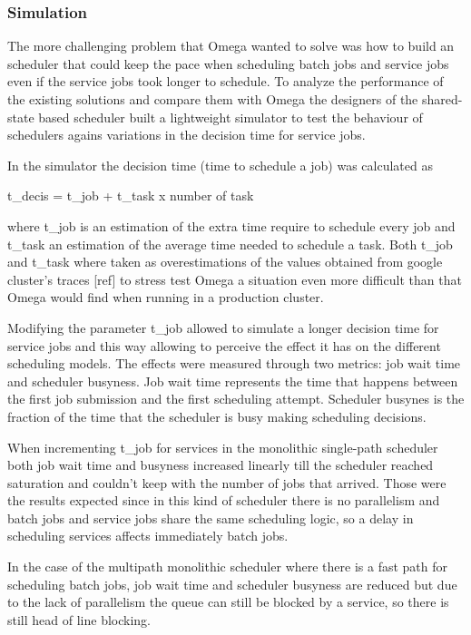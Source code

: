\documentclass{svjour3}                     %
\begin{document}
\subsubsection{Simulation}

The more challenging problem that Omega wanted to solve was how
to build an scheduler that could keep the pace when scheduling batch
jobs and service jobs even if the service jobs took longer to
schedule. To analyze the performance of the existing solutions and
compare them with Omega the designers of the shared-state based
scheduler built a lightweight simulator to test the behaviour of
schedulers agains variations in the decision time for service jobs.

In the simulator the decision time (time to schedule a job) was
calculated as

t\_{decis} = t\_{job} + t\_{task} x number of task

where t\_{job} is an estimation of the extra time require to schedule
every job and t\_{task} an estimation of the average time needed to
schedule a task. Both t\_{job} and t\_{task} where taken as
overestimations of the values obtained from google cluster's traces
[ref] to stress test Omega a situation even more difficult than that
Omega would find when running in a production cluster.

Modifying the parameter t\_{job} allowed to simulate a longer decision
time for service jobs and this way allowing to perceive the effect it
has on the different scheduling models. The effects were measured
through two metrics: job wait time and scheduler busyness. Job wait
time represents the time that happens between the first job submission
and the first scheduling attempt. Scheduler busynes is the fraction of
the time that the scheduler is busy making scheduling decisions.

When incrementing t\_{job} for services in the monolithic single-path
scheduler both job wait time and busyness increased linearly till the
scheduler reached saturation and couldn't keep with the number of jobs
that arrived. Those were the results expected since in this kind of
scheduler there is no parallelism and batch jobs and service jobs share
the same scheduling logic, so a delay in scheduling services affects
immediately batch jobs.

In the case of the multipath monolithic scheduler where there is
a fast path for scheduling batch jobs, job wait time and scheduler
busyness are reduced but due to the lack of parallelism the queue can
still be blocked by a service, so there is still head of line blocking.
\end{document}
